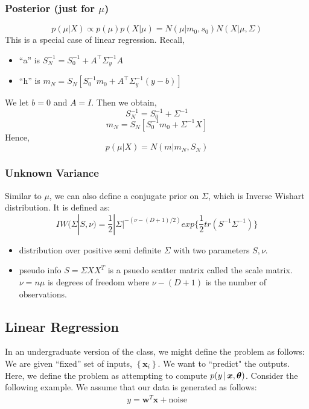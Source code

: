 \documentclass{article}
\renewcommand{\v}{\boldsymbol}
\begin{document}
\subsubsection{Posterior (just for $\mu$)}
$$p(\mu|X) \propto p(\mu)p(X|\mu) = N(\mu|m_0,s_0)N(X|\mu,\Sigma)$$
This is a special case of linear regression. Recall,
\begin{itemize}
\item ``a'' is $S_N^{-1} = S_0^{-1} + A^\top \Sigma_y^{-1}A$
\item ``h'' is $m_N = S_N \left[S_0^{-1}m_0 + A^\top \Sigma_y^{-1}(y - b)\right]$
\end{itemize}
We let $b=0$ and $A=I$. Then we obtain,
$$S_N^{-1} = S_0^{-1} + \Sigma^{-1}$$
$$m_N = S_N[S_0^{-1}m_0+\Sigma^{-1}X]$$
Hence,
$$p(\mu|X) = N(m|m_N,S_N)$$

\subsubsection{Unknown Variance}
Similar to $\mu$, we can also define a conjugate prior on $\Sigma$, which is Inverse Wishart distribution. It is defined as:
$$IW(\Sigma|S,\nu)=\frac{1}{2}|\Sigma|^{-(\nu-(D+1)/2)}exp\{\frac{1}{2}tr(S^{-1}\Sigma^{-1})\}$$

\begin{itemize}
\item distribution over positive semi definite $\Sigma$ with two parameters $S,\nu$.
\item pseudo info $S=\Sigma XX^T$ is a psuedo scatter matrix called the scale matrix. $\nu=n\mu$ is degrees of freedom where $\nu - (D+1)$ is the number of observations.
\end{itemize}

\subsection{Linear Regression}
In an undergraduate version of the class, we might define the problem as follows: We are given ``fixed'' set of inputs, $\left \{ \v{x}_i \right\}$. We want to ``predict" the outputs.
\\

\noindent Here, we define the problem as attempting to compute $p(y \given \v{x}, \v{\theta})$. Consider the following example. We assume that our data is generated as follows:
	\begin{align*}
		y = \v{w}^T \v{x} + \text{noise}
	\end{align*} 
	
\end{document}
